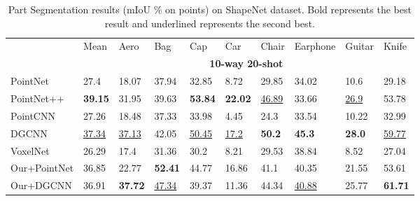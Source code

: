 \documentclass{article}
\begin{document}
\begin{table}[h]
  \caption{Part Segmentation results (mIoU \% on points) on ShapeNet dataset. Bold represents the best result and underlined represents the second best.}
  \label{part5}
  \centering
  \normalsize
  \setlength{\tabcolsep}{4.5pt}
  \begin{tabular}{llllllllll}
    \toprule
    
    &Mean&Aero&Bag&Cap&Car&Chair&Earphone&Guitar&Knife\\

    \cmidrule(r){2-10}
    
    & \multicolumn{9}{c}{\textbf{10-way 20-shot}}\\
    \cmidrule(r){2-10}
    PointNet &27.4 &18.07 &37.94 &32.85 &8.72 &29.85 &34.02 &10.6 &29.18\\ 
    PointNet++ &\textbf{39.15} &31.95 &39.63 &\textbf{53.84} &\textbf{22.02} &\underline{46.89} &33.66 &\underline{26.9} &53.78\\
    PointCNN &27.26 &18.48 &37.33 &33.98 &4.45 &24.3 &33.54 &10.22 &32.99\\
    DGCNN & \underline{37.34}&\underline{37.13} &42.05 &\underline{50.45} &\underline{17.2} &\textbf{50.2} &\textbf{45.3} &\textbf{28.0} &\underline{59.77} \\ 
    VoxelNet &26.29 &17.4 &31.36 &30.2 &8.21 &29.53 &38.84 &8.52 &27.04\\
    \midrule
    Our+PointNet &36.85 &22.77 &\textbf{52.41} &44.77 &16.86 &41.1 &40.35 &21.55 &53.61 \\
    Our+DGCNN &36.91 &\textbf{37.72}&\underline{47.34}&39.37&11.36&44.34&\underline{40.88}&25.77&\textbf{61.71}\\
    \bottomrule
  \end{tabular}
\end{table}
\end{document}
